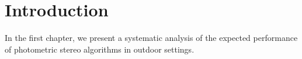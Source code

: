 \chapter*{Introduction}         %




In the first chapter, we present a systematic analysis of the expected performance of photometric stereo algorithms in outdoor settings. 